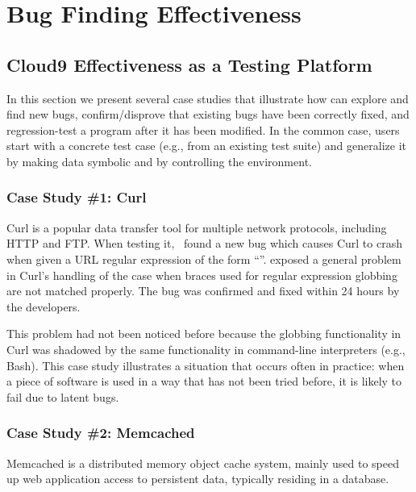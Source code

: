 
\section{Bug Finding Effectiveness}

\subsection{Cloud9 Effectiveness as a Testing Platform}

In this section we present several case studies that illustrate how \cnine can explore and find new bugs, confirm/disprove that existing bugs have been correctly fixed, and regression-test a program after it has been modified.  In the common case, \cnine users start with a concrete test case (e.g., from an existing test suite) and generalize it by making data symbolic and by controlling the environment.

\subsubsection{Case Study \#1: Curl}
\label{sec:curl}

Curl is a popular data transfer tool for multiple network protocols, including HTTP and FTP.  When testing it, \cnine\ found a new bug which causes Curl to crash when given a URL regular expression of the form ``''. \cnine exposed a general problem in Curl's handling of the case when braces used for regular expression globbing are not matched properly.  The bug was confirmed and fixed within 24 hours by the developers. 

This problem had not been noticed before because the globbing functionality in Curl was shadowed by the same functionality in command-line interpreters (e.g., Bash).  This case study illustrates a situation that occurs often in practice: when a piece of software is used in a way that has not been tried before, it is likely to fail due to latent bugs.

\subsubsection{Case Study \#2: Memcached}
\label{sec:memcached}

Memcached is a distributed memory object cache system, mainly used to speed up web application access to persistent
data, typically residing in a database. %

